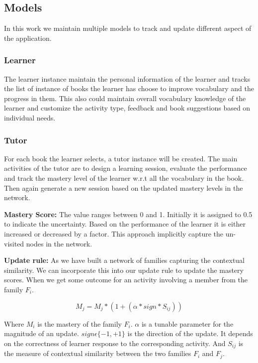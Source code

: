 \documentclass[11pt,a4paper]{article}
\begin{document}
\subsection{Models}
In this work we maintain multiple models to track and update different aspect
of the application.

\subsubsection{Learner}
The learner instance maintain the personal information of the learner and tracks
the list of instance of books the learner has choose to improve vocabulary and the
progress in them. This also could maintain overall vocabulary knowledge of
the learner and customize the activity type, feedback and book suggestions based
on individual needs.

\subsubsection{Tutor}
For each book the learner selects, a tutor instance will be created. The main
activities of the tutor are to design a learning session, evaluate the
performance and track the mastery level of the learner w.r.t all the vocabulary
in the book. Then again generate a new session based on the updated mastery
levels in the network.

\textbf{Mastery Score:} The value ranges between 0 and 1. Initially it is
assigned to 0.5 to indicate the uncertainty. Based on the performance of the
learner it is either increased or decreased by a factor. This approach implicitly
capture the un-visited nodes in the network.

\textbf{Update rule:} As we have built a network of families capturing the
contextual similarity. We can incorporate this into our update rule to update
the mastery scores. When we get some outcome for an activity involving a member
from the family ${F_i}$.

\begin{equation}
  M_j = M_j * (1 + (\alpha * sign * S_{ij}))
\end{equation}

Where ${M_i}$ is the mastery of the family ${F_i}$. ${\alpha}$ is a tunable parameter
for the magnitude of an update. ${sign \epsilon \{-1, +1\}}$ is the direction 
of the update. It depends on the correctness of learner response to the corresponding
activity. And ${S_{ij}}$ is the measure of contextual similarity between the two
families ${F_i}$ and ${F_j}$.
\end{document}
